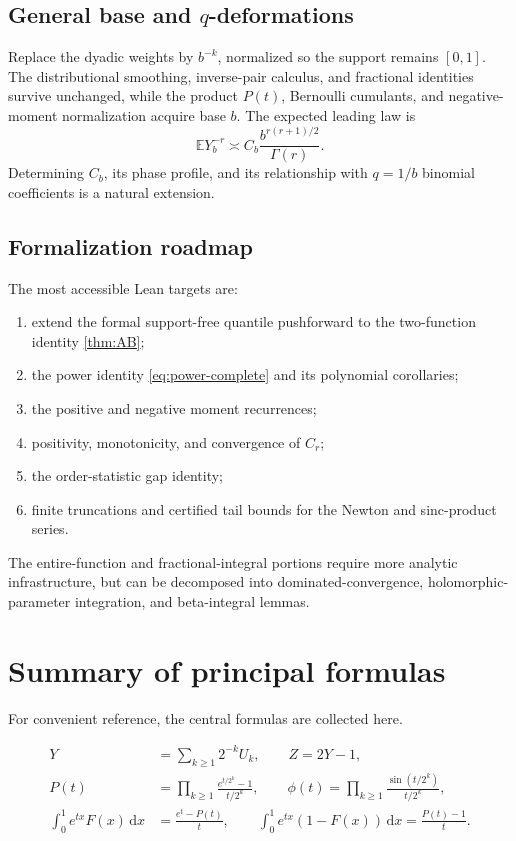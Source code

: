 \documentclass[11pt,oneside]{article}
\theoremstyle{definition}
\newcommand{\F}{F}
\newcommand{\E}{\mathbb E}
\newcommand{\dd}{\,\mathrm d}
\begin{document}
\subsection{General base and \texorpdfstring{\(q\)}{q}-deformations}

Replace the dyadic weights by \(b^{-k}\), normalized so the support remains \([0,1]\).
The distributional smoothing, inverse-pair calculus, and fractional identities survive
unchanged, while the product \(P(t)\), Bernoulli cumulants, and negative-moment
normalization acquire base \(b\).  The expected leading law is
\begin{equation}\label{eq:baseb-heuristic}
 \E Y_b^{-r}
 \asymp C_b\frac{b^{r(r+1)/2}}{\Gamma(r)}.
\end{equation}
Determining \(C_b\), its phase profile, and its relationship with \(q=1/b\) binomial
coefficients is a natural extension.

\subsection{Formalization roadmap}

The most accessible Lean targets are:
\begin{enumerate}
\item extend the formal support-free quantile pushforward to the two-function identity
      \cref{thm:AB};
\item the power identity \cref{eq:power-complete} and its polynomial corollaries;
\item the positive and negative moment recurrences;
\item positivity, monotonicity, and convergence of \(C_r\);
\item the order-statistic gap identity;
\item finite truncations and certified tail bounds for the Newton and sinc-product
series.
\end{enumerate}
The entire-function and fractional-integral portions require more analytic infrastructure,
but can be decomposed into dominated-convergence, holomorphic-parameter integration,
and beta-integral lemmas.

\section{Summary of principal formulas}

For convenient reference, the central formulas are collected here.

\begin{resultbox}
\begin{align*}
 Y&=\sum_{k\ge1}2^{-k}U_k,\qquad Z=2Y-1,\\
 P(t)&=\prod_{k\ge1}\frac{e^{t/2^k}-1}{t/2^k},\qquad
 \phi(t)=\prod_{k\ge1}\frac{\sin(t/2^k)}{t/2^k},\\
 \int_0^1e^{tx}\F(x)\dd x&=\frac{e^t-P(t)}t,\qquad
 \int_0^1e^{tx}(1-\F(x))\dd x=\frac{P(t)-1}t.
\end{align*}
\end{resultbox}
\end{document}
